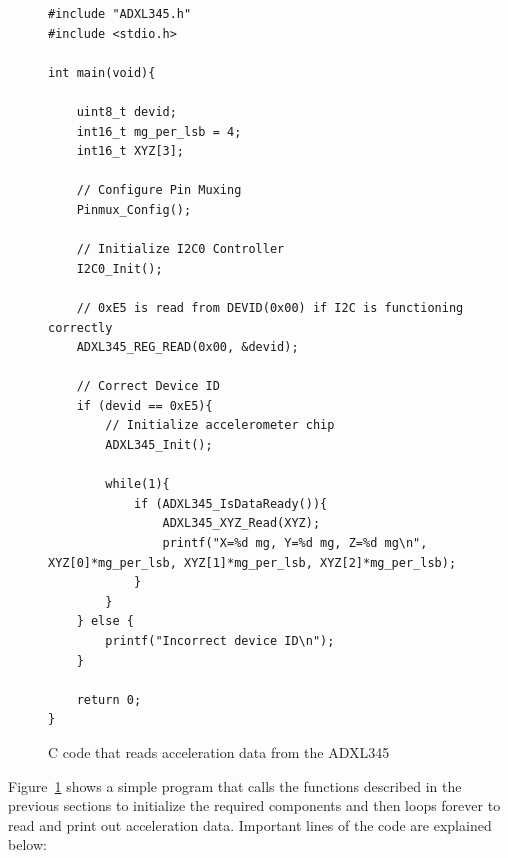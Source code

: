 \documentclass[11pt, twoside, pdftex]{article}
\begin{document}
\lstset{language=C,numbers=left}
\begin{figure}[h]
\begin{center}
\begin{minipage}[t]{16 cm}
\begin{lstlisting}
#include "ADXL345.h"
#include <stdio.h>

int main(void){

    uint8_t devid;
    int16_t mg_per_lsb = 4;
    int16_t XYZ[3];
    
    // Configure Pin Muxing
    Pinmux_Config();
    
    // Initialize I2C0 Controller
    I2C0_Init();
    
    // 0xE5 is read from DEVID(0x00) if I2C is functioning correctly
    ADXL345_REG_READ(0x00, &devid);
    
    // Correct Device ID
    if (devid == 0xE5){
        // Initialize accelerometer chip
        ADXL345_Init();
        
        while(1){
            if (ADXL345_IsDataReady()){
                ADXL345_XYZ_Read(XYZ);
                printf("X=%d mg, Y=%d mg, Z=%d mg\n", XYZ[0]*mg_per_lsb, XYZ[1]*mg_per_lsb, XYZ[2]*mg_per_lsb);
            }
        }
    } else {
        printf("Incorrect device ID\n");
    }
    
    return 0;
}
\end{lstlisting}
\end{minipage}
\end{center}
\vspace{-0.33in}\caption{C code that reads acceleration data from the ADXL345}
\label{fig:arm_c_code}
\end{figure}

Figure~\ref{fig:arm_c_code} shows a simple program that calls the functions described in the previous sections to initialize the required components and then loops forever to read and print out acceleration data. Important lines of the code are explained below:
\end{document}
